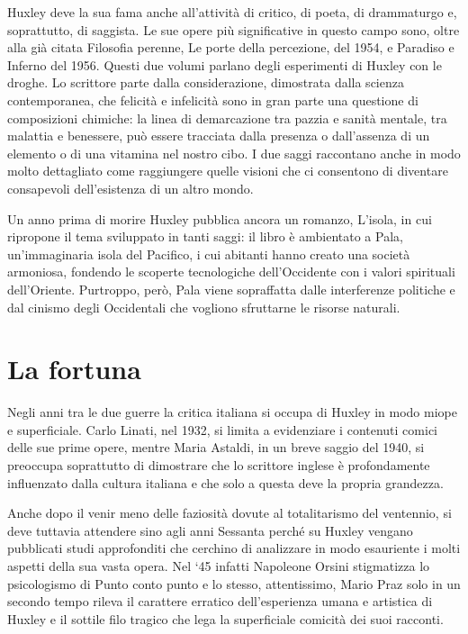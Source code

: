 \documentclass[
a5paper, %
10pt, %
twoside, 
onecolumn, %
openany, %
]{memoir}
\begin{document}
Huxley deve la sua fama anche all’attività di critico, di poeta, di drammaturgo e, soprattutto, di saggista. Le sue opere più significative in questo campo sono, oltre alla già citata Filosofia perenne, Le porte della percezione, del 1954, e Paradiso e Inferno del 1956. Questi due volumi parlano degli esperimenti di Huxley con le droghe. Lo scrittore parte dalla considerazione, dimostrata dalla scienza contemporanea, che felicità e infelicità sono in gran parte una questione di composizioni chimiche: la linea di demarcazione tra pazzia e sanità mentale, tra malattia e benessere, può essere tracciata dalla presenza o dall’assenza di un elemento o di una vitamina nel nostro cibo. I due saggi raccontano anche in modo molto dettagliato come raggiungere quelle visioni che ci consentono di diventare consapevoli dell’esistenza di un altro mondo.

Un anno prima di morire Huxley pubblica ancora un romanzo, L’isola, in cui ripropone il tema sviluppato in tanti saggi: il libro è ambientato a Pala, un’immaginaria isola del Pacifico, i cui abitanti hanno creato una società armoniosa, fondendo le scoperte tecnologiche dell’Occidente con i valori spirituali dell’Oriente. Purtroppo, però, Pala viene sopraffatta dalle interferenze politiche e dal cinismo degli Occidentali che vogliono sfruttarne le risorse naturali.

\chapter*{La fortuna}

Negli anni tra le due guerre la critica italiana si occupa di Huxley in modo miope e superficiale. Carlo Linati, nel 1932, si limita a evidenziare i contenuti comici delle sue prime opere, mentre Maria Astaldi, in un breve saggio del 1940, si preoccupa soprattutto di dimostrare che lo scrittore inglese è profondamente influenzato dalla cultura italiana e che solo a questa deve la propria grandezza.

Anche dopo il venir meno delle faziosità dovute al totalitarismo del ventennio, si deve tuttavia attendere sino agli anni Sessanta perché su Huxley vengano pubblicati studi approfonditi che cerchino di analizzare in modo esauriente i molti aspetti della sua vasta opera. Nel ‘45 infatti Napoleone Orsini stigmatizza lo psicologismo di Punto conto punto e lo stesso, attentissimo, Mario Praz solo in un secondo tempo rileva il carattere erratico dell’esperienza umana e artistica di Huxley e il sottile filo tragico che lega la superficiale comicità dei suoi racconti.
\end{document}
